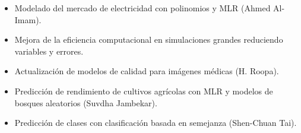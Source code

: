 \documentclass[12pt]{article}
\begin{document}
\begin{itemize}
  \item Modelado del mercado de electricidad con polinomios y MLR (Ahmed Al-Imam).
  \item Mejora de la eficiencia computacional en simulaciones grandes reduciendo variables y errores.
  \item Actualizaci\'on de modelos de calidad para im\'agenes m\'edicas (H. Roopa).
  \item Predicci\'on de rendimiento de cultivos agr\'icolas con MLR y modelos de bosques aleatorios (Suvdha Jambekar).
  \item Predicci\'on de clases con clasificaci\'on basada en semejanza (Shen-Chuan Tai).
\end{itemize}
\end{document}
